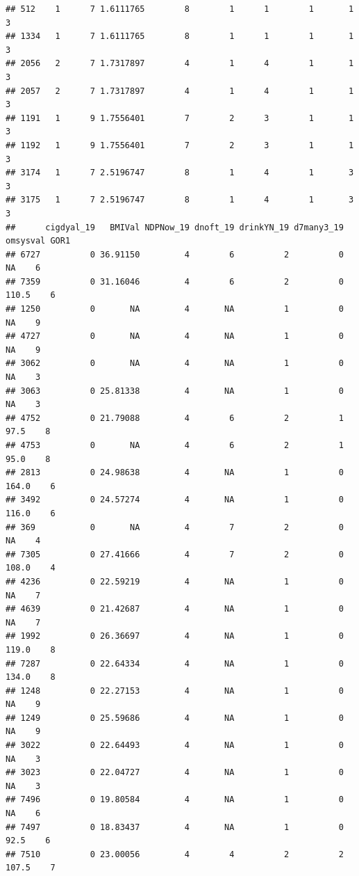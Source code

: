 \documentclass[
  11pt,
]{article}
\begin{document}
\begin{verbatim}
## 512    1      7 1.6111765        8        1      1        1       1          3
## 1334   1      7 1.6111765        8        1      1        1       1          3
## 2056   2      7 1.7317897        4        1      4        1       1          3
## 2057   2      7 1.7317897        4        1      4        1       1          3
## 1191   1      9 1.7556401        7        2      3        1       1          3
## 1192   1      9 1.7556401        7        2      3        1       1          3
## 3174   1      7 2.5196747        8        1      4        1       3          3
## 3175   1      7 2.5196747        8        1      4        1       3          3
##      cigdyal_19   BMIVal NDPNow_19 dnoft_19 drinkYN_19 d7many3_19 omsysval GOR1
## 6727          0 36.91150         4        6          2          0       NA    6
## 7359          0 31.16046         4        6          2          0    110.5    6
## 1250          0       NA         4       NA          1          0       NA    9
## 4727          0       NA         4       NA          1          0       NA    9
## 3062          0       NA         4       NA          1          0       NA    3
## 3063          0 25.81338         4       NA          1          0       NA    3
## 4752          0 21.79088         4        6          2          1     97.5    8
## 4753          0       NA         4        6          2          1     95.0    8
## 2813          0 24.98638         4       NA          1          0    164.0    6
## 3492          0 24.57274         4       NA          1          0    116.0    6
## 369           0       NA         4        7          2          0       NA    4
## 7305          0 27.41666         4        7          2          0    108.0    4
## 4236          0 22.59219         4       NA          1          0       NA    7
## 4639          0 21.42687         4       NA          1          0       NA    7
## 1992          0 26.36697         4       NA          1          0    119.0    8
## 7287          0 22.64334         4       NA          1          0    134.0    8
## 1248          0 22.27153         4       NA          1          0       NA    9
## 1249          0 25.59686         4       NA          1          0       NA    9
## 3022          0 22.64493         4       NA          1          0       NA    3
## 3023          0 22.04727         4       NA          1          0       NA    3
## 7496          0 19.80584         4       NA          1          0       NA    6
## 7497          0 18.83437         4       NA          1          0     92.5    6
## 7510          0 23.00056         4        4          2          2    107.5    7

\end{verbatim}
\end{document}
